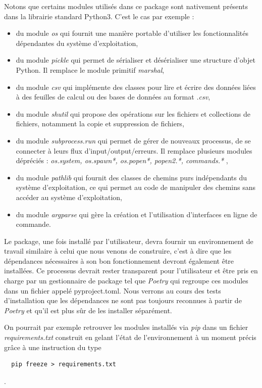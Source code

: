 \documentclass[twoside,a4paper,11pt,frenchb,openany]{report}
\begin{document}
Notons que certains modules utilisés dans ce package sont nativement présents dans la librairie standard Python3. C'est le cas par exemple :
\begin{itemize}
\item du module \textit{os} qui fournit une manière portable d'utiliser les fonctionnalités dépendantes du système d'exploitation,
\item du module \textit{pickle} qui permet de sérialiser et désérialiser une structure d'objet Python. Il remplace le module primitif \textit{marshal},
\item du module \textit{csv} qui implémente des classes pour lire et écrire des données liées à des feuilles de calcul ou des bases de données au format \textit{.csv},
\item du module \textit{shutil} qui propose des opérations sur les fichiers et collections de fichiers, notamment la copie et suppression de fichiers,
\item du module \textit{subprocess.run} qui permet de gérer de nouveaux processus, de se connecter à leurs flux d'input/output/erreurs. Il remplace plusieurs modules dépréciés : \textit{os.system, os.spawn*, os.popen*, popen2.*, commands.* },
\item du module \textit{pathlib} qui fournit des classes de chemins purs indépendants du système d'exploitation, ce qui permet au code de manipuler des chemins sans accéder au système d'exploitation,
\item du module \textit{argparse} qui gère la création et l'utilisation d'interfaces en ligne de commande.
\end{itemize}

Le package, une fois installé par l'utilisateur, devra fournir un environnement de travail similaire à celui que nous venons de construire, c'est à dire que les dépendances nécessaires à son bon fonctionnement devront également être installées. Ce processus devrait rester transparent pour l'utilisateur et être pris en charge par un gestionnaire de package tel que \textit{Poetry} qui regroupe ces modules dans un fichier appelé pyproject.toml. Nous verrons au cours des tests d'installation que les dépendances ne sont pas toujours reconnues à partir de \textit{Poetry} et qu'il est plus sûr de les installer séparément. 

On pourrait par exemple retrouver les modules installés via \textit{pip} dans un fichier \textit{requirements.txt} construit en gelant l'état de l'environnement à un moment précis grâce à une instruction du type
\begin{verbatim}  pip freeze > requirements.txt\end{verbatim}.
\end{document}
